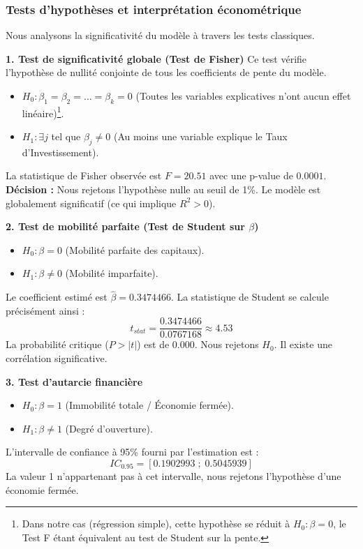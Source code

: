 \documentclass[12pt, a4paper]{article}
\begin{document}
\subsubsection*{Tests d'hypothèses et interprétation économétrique}

Nous analysons la significativité du modèle à travers les tests classiques.


\textbf{1. Test de significativité globale (Test de Fisher)}
Ce test vérifie l'hypothèse de nullité conjointe de tous les coefficients de pente du modèle.

\begin{itemize}
    \item $H_0 : \beta_1 = \beta_2 = \dots = \beta_k = 0$ (Toutes les variables explicatives n'ont aucun effet linéaire)\footnote{Dans notre cas (régression simple), cette hypothèse se réduit à $H_0 : \beta = 0$, le Test F étant équivalent au test de Student sur la pente.}.
    \item $H_1 : \exists j$ tel que $\beta_j \neq 0$ (Au moins une variable explique le Taux d'Investissement).
\end{itemize}

La statistique de Fisher observée est $F = 20.51$ avec une p-value de $0.0001$.
\textbf{Décision :} Nous rejetons l'hypothèse nulle au seuil de 1\%. Le modèle est globalement significatif (ce qui implique $R^2 > 0$).

\textbf{2. Test de mobilité parfaite (Test de Student sur $\beta$)}
\begin{itemize}
    \item $H_0 : \beta = 0$ (Mobilité parfaite des capitaux).
    \item $H_1 : \beta \neq 0$ (Mobilité imparfaite).
\end{itemize}
Le coefficient estimé est $\hat{\beta} = 0.3474466$. La statistique de Student se calcule précisément ainsi :
\begin{equation}
t_{stat} = \frac{0.3474466}{0.0767168} \approx 4.53
\end{equation}
La probabilité critique ($P>|t|$) est de $0.000$.
Nous rejetons $H_0$. Il existe une corrélation significative.

\textbf{3. Test d'autarcie financière}
\begin{itemize}
    \item $H_0 : \beta = 1$ (Immobilité totale / Économie fermée).
    \item $H_1 : \beta \neq 1$ (Degré d'ouverture).
\end{itemize}
L'intervalle de confiance à 95\% fourni par l'estimation est :
\begin{equation}
IC_{0.95} = [0.1902993 \; ; \; 0.5045939]
\end{equation}
La valeur 1 n'appartenant pas à cet intervalle, nous rejetons l'hypothèse d'une économie fermée.
\end{document}
